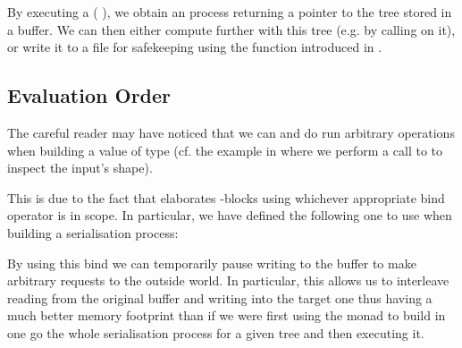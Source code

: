 
By executing a (  ), we
obtain an  process returning a pointer to the tree 
stored in a buffer.
%
We can then either compute further with this tree (e.g. by calling
 on it), or write it to a file for safekeeping
using the function 
introduced in .

\subsection{Evaluation Order}

The careful reader may have noticed that we can and do run arbitrary 
operations when building a value of type 
(cf. the  example in  where we perform
a call to  to inspect the input's shape).

This is due to the fact that \idris{} elaborates -blocks using
whichever appropriate bind operator is in scope. In particular, we have defined
the following one to use when building a serialisation process:


By using this bind we can temporarily pause writing to the buffer to make
arbitrary  requests to the outside world.
%
In particular, this allows us to interleave reading from the original buffer
and writing into the target one thus having a much better memory footprint than
if we were first using the  monad to build in one go the whole
serialisation process for a given tree and then executing it.
